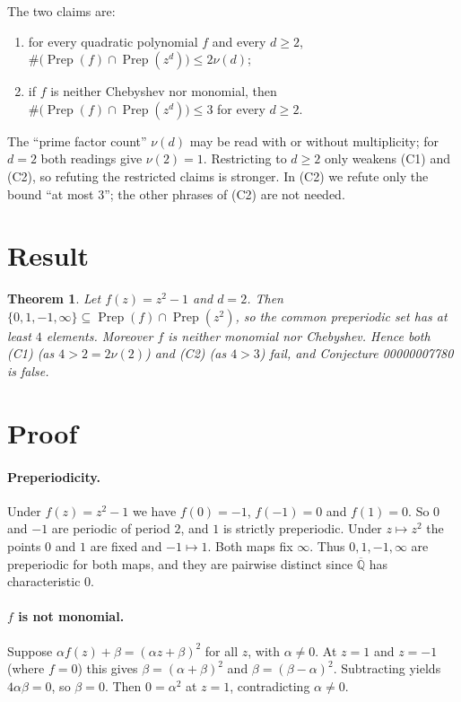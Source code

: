\documentclass[11pt]{article}
\theoremstyle{plain}
\newtheorem{theorem}{Theorem}
\theoremstyle{definition}
\theoremstyle{remark}
\newcommand{\Qb}{\overline{\mathbb Q}}
\newcommand{\Prep}{\operatorname{Prep}}
\begin{document}
The two claims are:
\begin{enumerate}
\item[(C1)] for every quadratic polynomial $f$ and every $d\ge2$,
  $\#\bigl(\Prep(f)\cap\Prep(z^d)\bigr)\le2\nu(d)$;
\item[(C2)] if $f$ is neither Chebyshev nor monomial, then
  $\#\bigl(\Prep(f)\cap\Prep(z^d)\bigr)\le3$ for every $d\ge2$.
\end{enumerate}
The ``prime factor count'' $\nu(d)$ may be read with or without multiplicity; for
$d=2$ both readings give $\nu(2)=1$. Restricting to $d\ge2$ only weakens (C1) and
(C2), so refuting the restricted claims is stronger. In (C2) we refute only the
bound ``at most $3$''; the other phrases of (C2) are not needed.

\section{Result}

\begin{theorem}\label{thm:main}
Let $f(z)=z^2-1$ and $d=2$. Then $\{0,1,-1,\infty\}\subseteq\Prep(f)\cap\Prep(z^2)$,
so the common preperiodic set has at least $4$ elements. Moreover $f$ is neither
monomial nor Chebyshev. Hence both (C1) (as $4>2=2\nu(2)$) and (C2) (as $4>3$) fail,
and Conjecture 00000007780 is false.
\end{theorem}

\section{Proof}

\paragraph{Preperiodicity.} Under $f(z)=z^2-1$ we have $f(0)=-1$, $f(-1)=0$ and
$f(1)=0$. So $0$ and $-1$ are periodic of period $2$, and $1$ is strictly preperiodic.
Under $z\mapsto z^2$ the points $0$ and $1$ are fixed and $-1\mapsto1$. Both maps fix
$\infty$. Thus $0,1,-1,\infty$ are preperiodic for both maps, and they are pairwise
distinct since $\Qb$ has characteristic $0$.

\paragraph{$f$ is not monomial.} Suppose $\alpha f(z)+\beta=(\alpha z+\beta)^2$ for
all $z$, with $\alpha\ne0$. At $z=1$ and $z=-1$ (where $f=0$) this gives
$\beta=(\alpha+\beta)^2$ and $\beta=(\beta-\alpha)^2$. Subtracting yields
$4\alpha\beta=0$, so $\beta=0$. Then $0=\alpha^2$ at $z=1$, contradicting
$\alpha\ne0$.
\end{document}
